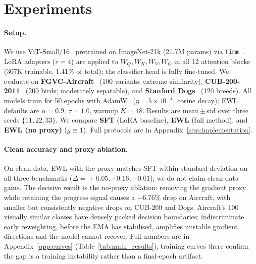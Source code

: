 \section{Experiments}
\label{sec:experiments}

\paragraph{Setup.}
We use ViT-Small/16~\cite{dosovitskiy2021vit} pretrained on ImageNet-21k
(21.7M params) via \texttt{timm}~\cite{rw2019timm}.
LoRA adapters ($r{=}4$) are applied to $W_Q, W_K, W_V, W_O$ in all 12 attention
blocks (307K trainable, 1.41\% of total); the classifier head is fully
fine-tuned.
We evaluate on \textbf{FGVC-Aircraft}~\cite{maji2013aircraft} (100 variants;
extreme similarity), \textbf{CUB-200-2011}~\cite{wah2011cub} (200 birds;
moderately separable), and \textbf{Stanford
Dogs}~\cite{KhoslaYaoJayadevaprakashFeiFei_FGVC2011} (120 breeds).
All models train for 50 epochs with AdamW~\cite{loshchilov2017decoupled}
($\eta{=}5{\times}10^{-4}$, cosine decay); EWL defaults are $\alpha{=}0.9$,
$\tau{=}1.0$, warmup $K{=}48$.
Results are mean\,$\pm$\,std over three seeds $\{11,22,33\}$.
We compare \textbf{SFT} (LoRA baseline), \textbf{EWL} (full method), and
\textbf{EWL (no proxy)} ($g\equiv 1$).
Full protocols are in Appendix~\ref{app:implementation}.

\paragraph{Clean accuracy and proxy ablation.}
On clean data, EWL with the proxy matches SFT within standard deviation on
all three benchmarks ($\Delta\!=\!+0.05, +0.16, -0.01$); we do not claim
clean-data gains.
The decisive result is the no-proxy ablation: removing the gradient proxy
while retaining the progress signal causes a $\mathbf{-6.76\%}$ drop on
Aircraft, with smaller but consistently negative drops on CUB-200 and Dogs.
Aircraft's 100 visually similar classes have densely packed decision boundaries;
indiscriminate early reweighting, before the EMA has stabilised, amplifies
unstable gradient directions and the model cannot recover.
Full numbers are in Appendix~\ref{app:curves} (Table~\ref{tab:main_results});
training curves there confirm the gap is a training instability rather than a
final-epoch artifact.

